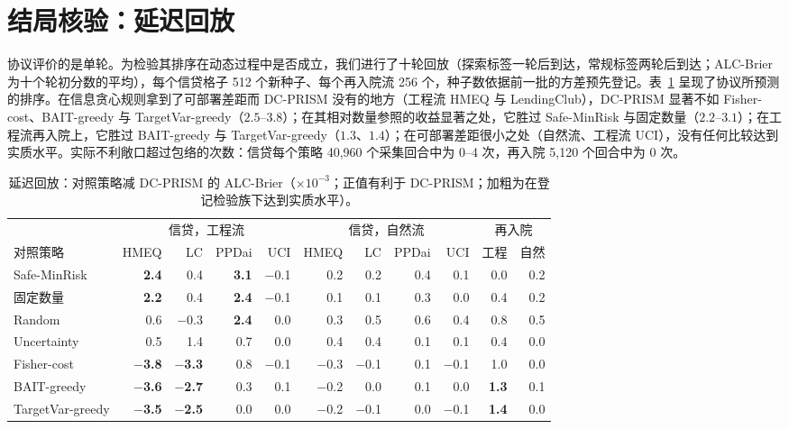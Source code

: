 \documentclass[runningheads]{llncs}
\begin{document}
\section{结局核验：延迟回放}
\label{sec:replay}
协议评价的是单轮。为检验其排序在动态过程中是否成立，我们进行了十轮回放（探索标签一轮后到达，常规标签两轮后到达；ALC-Brier 为十个轮初分数的平均），每个信贷格子 512 个新种子、每个再入院流 256 个，种子数依据前一批的方差预先登记。表~\ref{tab:replay} 呈现了协议所预测的排序。在信息贪心规则拿到了可部署差距而 DC-PRISM 没有的地方（工程流 HMEQ 与 LendingClub），DC-PRISM 显著不如 Fisher-cost、BAIT-greedy 与 TargetVar-greedy（$2.5$--$3.8$）；在其相对数量参照的收益显著之处，它胜过 Safe-MinRisk 与固定数量（$2.2$--$3.1$）；在工程流再入院上，它胜过 BAIT-greedy 与 TargetVar-greedy（$1.3$、$1.4$）；在可部署差距很小之处（自然流、工程流 UCI），没有任何比较达到实质水平。实际不利敞口超过包络的次数：信贷每个策略 40{,}960 个采集回合中为 0--4 次，再入院 5{,}120 个回合中为 0 次。

\begin{table}[t]
\caption{延迟回放：对照策略减 DC-PRISM 的 ALC-Brier（$\times10^{-3}$；正值有利于 DC-PRISM；加粗为在登记检验族下达到实质水平）。}
\label{tab:replay}
\centering\scriptsize
\setlength{\tabcolsep}{2.4pt}
\begin{tabular}{lrrrrrrrrrr}
\toprule
& \multicolumn{4}{c}{信贷，工程流} & \multicolumn{4}{c}{信贷，自然流} & \multicolumn{2}{c}{再入院} \\
\cmidrule(lr){2-5}\cmidrule(lr){6-9}\cmidrule(lr){10-11}
对照策略 & HMEQ & LC & PPDai & UCI & HMEQ & LC & PPDai & UCI & 工程 & 自然 \\
\midrule
Safe-MinRisk & \textbf{2.4} & 0.4 & \textbf{3.1} & $-$0.1 & 0.2 & 0.2 & 0.4 & 0.1 & 0.0 & 0.2 \\
固定数量 & \textbf{2.2} & 0.4 & \textbf{2.4} & $-$0.1 & 0.1 & 0.1 & 0.3 & 0.0 & 0.4 & 0.2 \\
Random & 0.6 & $-$0.3 & \textbf{2.4} & 0.0 & 0.3 & 0.5 & 0.6 & 0.4 & 0.8 & 0.5 \\
Uncertainty & 0.5 & 1.4 & 0.7 & 0.0 & 0.4 & 0.4 & 0.1 & 0.1 & 0.4 & 0.0 \\
Fisher-cost & \textbf{$-$3.8} & \textbf{$-$3.3} & 0.8 & $-$0.1 & $-$0.3 & $-$0.1 & 0.1 & $-$0.1 & 1.0 & 0.0 \\
BAIT-greedy & \textbf{$-$3.6} & \textbf{$-$2.7} & 0.3 & 0.1 & $-$0.2 & 0.0 & 0.1 & 0.0 & \textbf{1.3} & 0.1 \\
TargetVar-greedy & \textbf{$-$3.5} & \textbf{$-$2.5} & 0.0 & 0.0 & $-$0.2 & $-$0.1 & 0.0 & $-$0.1 & \textbf{1.4} & 0.0 \\
\bottomrule
\end{tabular}
\end{table}
\end{document}
